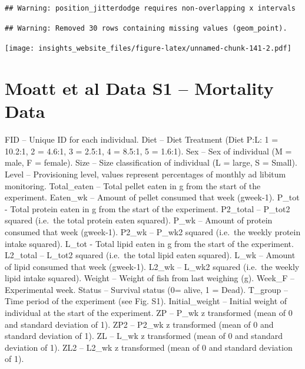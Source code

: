 \documentclass[]{book}
\newenvironment{Shaded}{\begin{snugshade}}{\end{snugshade}}
\newcommand{\DataTypeTok}[1]{\textcolor[rgb]{0.13,0.29,0.53}{#1}}
\newcommand{\DecValTok}[1]{\textcolor[rgb]{0.00,0.00,0.81}{#1}}
\newcommand{\FloatTok}[1]{\textcolor[rgb]{0.00,0.00,0.81}{#1}}
\newcommand{\KeywordTok}[1]{\textcolor[rgb]{0.13,0.29,0.53}{\textbf{#1}}}
\newcommand{\NormalTok}[1]{#1}
\newcommand{\OperatorTok}[1]{\textcolor[rgb]{0.81,0.36,0.00}{\textbf{#1}}}
\newcommand{\StringTok}[1]{\textcolor[rgb]{0.31,0.60,0.02}{#1}}
\begin{document}
\begin{Shaded}
\end{Shaded}

\begin{verbatim}
## Warning: position_jitterdodge requires non-overlapping x intervals
\end{verbatim}

\begin{verbatim}
## Warning: Removed 30 rows containing missing values (geom_point).
\end{verbatim}

\texttt{[image: insights\_website\_files/figure-latex/unnamed-chunk-141-2.pdf]}

\hypertarget{moatt-et-al-data-s1-mortality-data}{%
\section{Moatt et al Data S1 -- Mortality Data}\label{moatt-et-al-data-s1-mortality-data}}

FID -- Unique ID for each individual.
Diet -- Diet Treatment (Diet P:L: 1 = 10.2:1, 2 = 4.6:1, 3 = 2.5:1, 4 = 8.5:1, 5 = 1.6:1).
Sex -- Sex of individual (M = male, F = female).
Size -- Size classification of individual (L = large, S = Small).
Level -- Provisioning level, values represent percentages of monthly ad libitum monitoring.
Total\_eaten -- Total pellet eaten in g from the start of the experiment.
Eaten\_wk -- Amount of pellet consumed that week (gweek-1).
P\_tot - Total protein eaten in g from the start of the experiment.
P2\_total -- P\_tot2 squared (i.e.~the total protein eaten squared).
P\_wk -- Amount of protein consumed that week (gweek-1).
P2\_wk -- P\_wk2 squared (i.e.~the weekly protein intake squared).
L\_tot - Total lipid eaten in g from the start of the experiment.
L2\_total -- L\_tot2 squared (i.e.~the total lipid eaten squared).
L\_wk -- Amount of lipid consumed that week (gweek-1).
L2\_wk -- L\_wk2 squared (i.e.~the weekly lipid intake squared).
Weight -- Weight of fish from last weighing (g).
Week\_F -- Experimental week.
Status -- Survival status (0= alive, 1 = Dead).
T\_group -- Time period of the experiment (see Fig. S1).
Initial\_weight -- Initial weight of individual at the start of the experiment.
ZP -- P\_wk z transformed (mean of 0 and standard deviation of 1).
ZP2 -- P2\_wk z transformed (mean of 0 and standard deviation of 1).
ZL -- L\_wk z transformed (mean of 0 and standard deviation of 1).
ZL2 -- L2\_wk z transformed (mean of 0 and standard deviation of 1).
\end{document}

